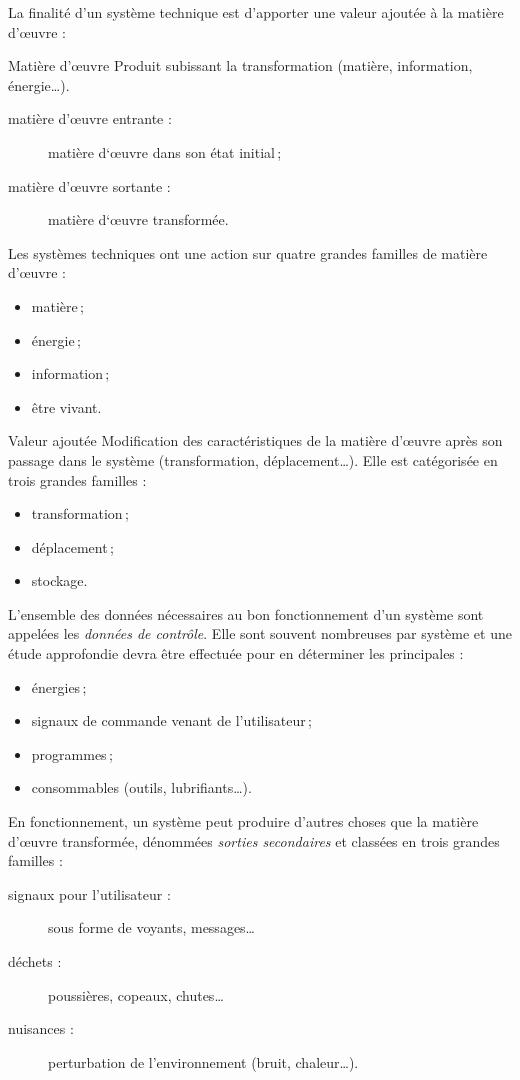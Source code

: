 La finalité d'un système technique est d'apporter une valeur ajoutée à la matière d'\oe{}uvre :
\begin{definition}{Matière d'\oe{}uvre}{}
Produit subissant la transformation (matière, information, énergie\ldots).
\begin{description}
\item [matière d'\oe{}uvre entrante :] matière d‘\oe{}uvre dans son état initial\,;
\item [matière d'\oe{}uvre sortante :] matière d‘\oe{}uvre transformée.
\end{description}
Les systèmes techniques ont une action sur quatre grandes familles de matière d'\oe{}uvre :
\begin{itemize}
\item matière\,;
\item énergie\,;
\item information\,;
\item être vivant.
\end{itemize}
\end{definition}

\begin{definition}{Valeur ajoutée}{}
Modification des caractéristiques de la matière d'\oe{}uvre après son passage dans le système (transformation, déplacement\ldots). Elle est catégorisée en trois grandes familles :
\begin{itemize}
\item transformation\,;
\item déplacement\,;
\item stockage.
\end{itemize}
\end{definition}

L'ensemble des données nécessaires au bon fonctionnement d'un système sont appelées les \emph{données de contrôle}. Elle sont souvent nombreuses par système et une étude approfondie devra être effectuée pour en déterminer les principales :
\begin{itemize}
\item énergies\,;
\item signaux de commande venant de l'utilisateur\,;
\item programmes\,;
\item consommables (outils, lubrifiants\ldots).
\end{itemize}

En fonctionnement, un système peut produire d'autres choses que la matière d'\oe{}uvre transformée, dénommées \emph{sorties secondaires} et classées en trois grandes familles :
\begin{description}
\item [signaux pour l'utilisateur :] sous forme de voyants, messages\ldots
\item [déchets :] poussières, copeaux, chutes\ldots
\item [nuisances :] perturbation de l'environnement (bruit, chaleur\ldots).
\end{description}

